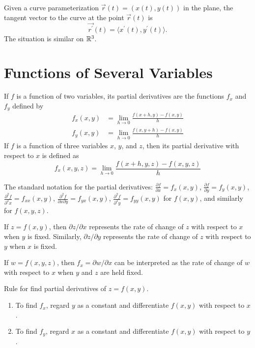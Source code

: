 \begin{definition}
	Given a curve parameterization $\vec{r}(t) = (x(t), y(t))$ in the plane, the
	tangent vector to the curve at the point $\vec{r}(t)$ is
	\[
		\vec{r^\prime}(t) = \langle x^\prime(t), y^\prime(t) \rangle.
	\]
	The situation is similar on ${\mathbb{R}}^3$.
\end{definition}

\section*{Functions of Several Variables}

\begin{definition}
	If $f$ is a function of two variables, its partial derivatives are the
	functions $f_x$ and $f_y$ defined by
	\begin{align*}
		f_x(x, y) &= \lim_{h \rightarrow 0} \frac{f(x + h, y) - f(x, y)}{h} \\
		f_y(x, y) &= \lim_{h \rightarrow 0} \frac{f(x, y + h) - f(x, y)}{h}
	\end{align*}
	If $f$ is a function of three variables $x$, $y$, and $z$, then its partial
	derivative with respect to $x$ is defined as
	\[
		f_x(x, y, z) = \lim_{h \rightarrow 0} \frac{f(x +h, y, z) - f(x, y, z)}{h}
	\]
\end{definition}

\begin{notation}
	The standard notation for the partial derivatives: $\frac{\partial f}{\partial
	x} = f_x(x, y)$, $\frac{\partial f}{\partial y} = f_y(x, y)$,
	$\frac{\partial^2 f}{\partial^2 x} = f_{xx}(x, y)$, $\frac{\partial^2
	f}{\partial x \partial y} = f_{yx}(x, y)$, $\frac{\partial^2 f}{\partial^2 y}
	= f_{yy}(x, y)$ for $f(x, y)$, and similarly for $f(x, y, z)$.
\end{notation}

\begin{interpretation}
	If $z = f(x, y)$, then $\partial z / \partial x$ represents the rate of change
	of $z$ with respect to $x$ when $y$ is fixed. Similarly, $\partial z /
	\partial y$ represents the rate of change of $z$ with respect to $y$ when $x$
	is fixed.

	If $w = f(x, y, z)$, then $f_x = \partial w / \partial x$ can be interpreted
	as the rate of change of $w$ with respect to $x$ when $y$ and $z$ are held
	fixed.
\end{interpretation}

\begin{fact}
	Rule for find partial derivatives of $z = f(x, y)$.
	\begin{enumerate}
		\item To find $f_x$, regard $y$ as a constant and differentiate $f(x, y)$
			with respect to $x$.
		\item To find $f_y$, regard $x$ as a constant and differentiate $f(x, y)$
			with respect to $y$.
	\end{enumerate}
\end{fact}

